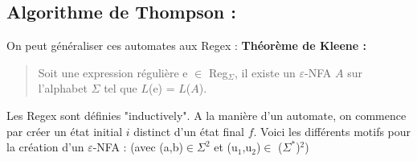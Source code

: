 \documentclass{article}
\begin{document}
\subsection{Algorithme de Thompson :}
On peut généraliser ces automates aux Regex :\newline
\textbf{Théorème de Kleene :}
\begin{quote}
    Soit une expression régulière e $\in$ Reg$_{\Sigma}$, il existe un $\varepsilon$-NFA $A$ sur l'alphabet $\Sigma$ tel que $L$(e) = $L$($A$).\newline
\end{quote}
Les Regex sont définies "inductively".\newline
A la manière d'un automate, on commence par créer un état initial $i$ distinct d'un état final $f$.
Voici les différents motifs pour la création d'un $\varepsilon$-NFA : (avec (a,b)$\in \Sigma^{2}$ et (u$_{1}$,u$_{2}$)$\in$ ($\Sigma^{*}$)$^{2}$)
\end{document}
